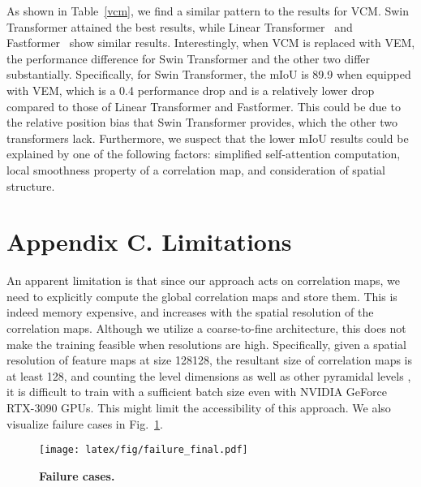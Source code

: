 As shown in Table~\ref{vcm}, we find a similar pattern to the results for VCM. Swin Transformer attained the best results, while Linear Transformer~\cite{katharopoulos2020transformers} and Fastformer~\cite{wu2021fastformer} show similar results. Interestingly, when VCM is replaced with VEM, the performance difference for Swin Transformer and the other two differ substantially. Specifically, for Swin Transformer, the mIoU is 89.9 when equipped with VEM, which is a 0.4 performance drop and is a relatively lower drop compared to those of Linear Transformer and Fastformer. This could be due to the relative position bias that Swin Transformer provides, which the other two transformers lack. Furthermore, we suspect that the lower mIoU results could be explained by one of the following factors: simplified self-attention computation, local smoothness property of a correlation map, and consideration of spatial structure.  \vspace{-10pt}




\section*{Appendix C. Limitations}
An apparent limitation is that since our approach acts on correlation maps, we need to explicitly compute the global correlation maps and store them. This is indeed memory expensive, and increases with the spatial resolution of the correlation maps. Although we utilize a coarse-to-fine architecture, this does not make the training feasible when resolutions are high. Specifically, given a spatial resolution of feature maps at size 128128, the resultant size of correlation maps is at least 128, and counting the level dimensions as well as other pyramidal levels , it is difficult to train with a sufficient batch size even with NVIDIA GeForce RTX-3090 GPUs. This might limit the accessibility of this approach. We also visualize failure cases in Fig.~\ref{failure}. \vspace{-10pt}


\begin{figure}[t]
\centering
\texttt{[image: latex/fig/failure\_final.pdf]}
\vspace{-10pt}\caption{\textbf{Failure cases.}   }
\label{failure}
\end{figure}

\clearpage





